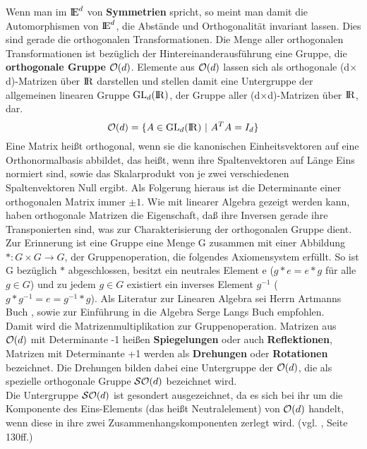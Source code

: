 Wenn man im $\mbox{$\rm I\!E$}^d$ von {\bf Symmetrien} spricht, so meint man
damit die Automorphismen von $\mbox{$\rm I\!E$}^d$, die Abstände und Orthogonalität
invariant lassen. Dies sind gerade die orthogonalen Transformationen.
Die Menge aller orthogonalen Transformationen ist bezüglich der
Hintereinanderausführung eine Gruppe, die {\bf orthogonale Gruppe}
${\cal O}(d)$. Elemente aus ${\cal O}(d)$ lassen sich
als orthogonale (d$\times$d)-Matrizen über $\mbox{$\rm I\!R$}$ darstellen und stellen damit
eine Untergruppe der allgemeinen linearen Gruppe $\mbox{GL}_d(\mbox{$\rm I\!R$})$, der Gruppe
aller (d$\times$d)-Matrizen über $\mbox{$\rm I\!R$}$, dar.
$${\cal O}(d) = \{ A\in\mbox{GL}_d(\mbox{$\rm I\!R$})~|~A^T A = I_d\}$$
{\scsi
Eine Matrix heißt orthogonal, wenn sie die kanonischen Einheitsvektoren auf
eine Orthonormalbasis abbildet, das heißt, wenn ihre Spaltenvektoren
auf Länge Eins normiert sind, sowie das Skalarprodukt von je zwei
verschiedenen Spaltenvektoren Null ergibt. Als Folgerung hieraus ist die
Determinante einer orthogonalen Matrix immer $\pm 1$. Wie mit linearer Algebra
gezeigt werden kann, haben orthogonale Matrizen die Eigenschaft, daß ihre
Inversen gerade ihre Transponierten sind, was zur Charakterisierung
der orthogonalen Gruppe dient.\\
Zur Erinnerung ist eine Gruppe eine Menge G zusammen mit einer Abbildung
$*:G\times G\to G$, der Gruppenoperation, die folgendes Axiomensystem erfüllt.
So ist G bezüglich $*$ abgeschlossen, besitzt ein neutrales Element e
($g*e=e*g$ für alle $g\in G$) und zu jedem $g\in G$ existiert ein inverses
Element $g^{-1}$ ($g*g^{-1}=e=g^{-1}*g$). Als Literatur zur Linearen Algebra
sei Herrn Artmanns Buch \cite{Art:89}, sowie zur Einführung in die
Algebra Serge Langs Buch \cite{La:79} empfohlen.
}\\
Damit wird die Matrizenmultiplikation zur Gruppenoperation.
Matrizen aus ${\cal O}(d)$ mit Determinante -1 heißen {\bf Spiegelungen} oder
auch {\bf Reflektionen}, Matrizen mit
Determinante +1 werden als {\bf Drehungen} oder {\bf Rotationen}
 bezeichnet. Die Drehungen bilden dabei eine Untergruppe der
${\cal O}(d)$, die als spezielle orthogonale Gruppe ${\cal SO}(d)$ bezeichnet
wird.\\
{\scsi
Die Untergruppe ${\cal SO}(d)$ ist gesondert ausgezeichnet, da es sich bei
ihr um die Komponente des Eins-Elements (das heißt Neutralelement) von
${\cal O}(d)$ handelt, wenn diese in ihre zwei Zusammenhangskomponenten
zerlegt wird. (vgl. \cite{Os:92}, Seite 130ff.)}

